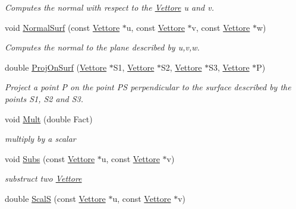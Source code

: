 \begin{DoxyCompactItemize}
\begin{DoxyCompactList}\small\item\em Computes the normal with respect to the \hyperlink{classVettore}{Vettore} u and v. \end{DoxyCompactList}\item 
void \hyperlink{classVettore_a37c16d330917daaf77a01df8d54d2ffa}{Normal\+Surf} (const \hyperlink{classVettore}{Vettore} $\ast$u, const \hyperlink{classVettore}{Vettore} $\ast$v, const \hyperlink{classVettore}{Vettore} $\ast$w)\hypertarget{classVettore_a37c16d330917daaf77a01df8d54d2ffa}{}\label{classVettore_a37c16d330917daaf77a01df8d54d2ffa}

\begin{DoxyCompactList}\small\item\em Computes the normal to the plane described by u,v,w. \end{DoxyCompactList}\item 
double \hyperlink{classVettore_a0076d507f0189c0bafa974af74afaae7}{Proj\+On\+Surf} (\hyperlink{classVettore}{Vettore} $\ast$S1, \hyperlink{classVettore}{Vettore} $\ast$S2, \hyperlink{classVettore}{Vettore} $\ast$S3, \hyperlink{classVettore}{Vettore} $\ast$P)\hypertarget{classVettore_a0076d507f0189c0bafa974af74afaae7}{}\label{classVettore_a0076d507f0189c0bafa974af74afaae7}

\begin{DoxyCompactList}\small\item\em Project a point P on the point PS perpendicular to the surface described by the points S1, S2 and S3. \end{DoxyCompactList}\item 
void \hyperlink{classVettore_a462cc9cf81c1f3a1b3c8b0136d6378d5}{Mult} (double Fact)\hypertarget{classVettore_a462cc9cf81c1f3a1b3c8b0136d6378d5}{}\label{classVettore_a462cc9cf81c1f3a1b3c8b0136d6378d5}

\begin{DoxyCompactList}\small\item\em multiply by a scalar \end{DoxyCompactList}\item 
void \hyperlink{classVettore_a5c3a30fe490ef9563842299380df3ba5}{Subs} (const \hyperlink{classVettore}{Vettore} $\ast$u, const \hyperlink{classVettore}{Vettore} $\ast$v)\hypertarget{classVettore_a5c3a30fe490ef9563842299380df3ba5}{}\label{classVettore_a5c3a30fe490ef9563842299380df3ba5}

\begin{DoxyCompactList}\small\item\em substruct two \hyperlink{classVettore}{Vettore} \end{DoxyCompactList}\item 
double \hyperlink{classVettore_a956dbbb6159671072b4eb5724b60748e}{ScalS} (const \hyperlink{classVettore}{Vettore} $\ast$u, const \hyperlink{classVettore}{Vettore} $\ast$v)\hypertarget{classVettore_a956dbbb6159671072b4eb5724b60748e}{}\label{classVettore_a956dbbb6159671072b4eb5724b60748e}


\end{DoxyCompactItemize}
